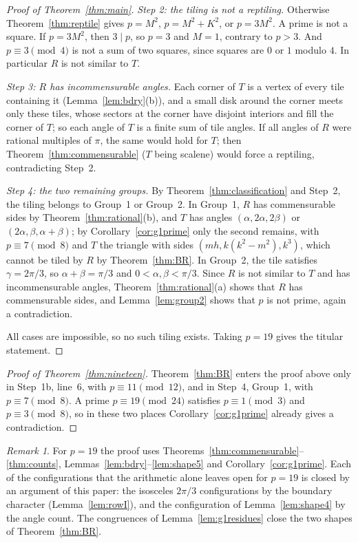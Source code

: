 \documentclass[11pt]{amsart}
\theoremstyle{remark}
\newtheorem{remark}[theorem]{Remark}
\begin{document}
\begin{proof}[Proof of Theorem~\ref{thm:main}]
\emph{Step 2: the tiling is not a reptiling.} Otherwise Theorem~\ref{thm:reptile} gives $p=M^2$, $p=M^2+K^2$, or $p=3M^2$. A prime is not a square. If $p=3M^2$, then $3\mid p$, so $p=3$ and $M=1$, contrary to $p>3$. And $p\equiv 3\pmod 4$ is not a sum of two squares, since squares are $0$ or $1$ modulo $4$. In particular $R$ is not similar to $T$.

\emph{Step 3: $R$ has incommensurable angles.} Each corner of $T$ is a vertex of every tile containing it (Lemma~\ref{lem:bdry}(b)), and a small disk around the corner meets only these tiles, whose sectors at the corner have disjoint interiors and fill the corner of $T$; so each angle of $T$ is a finite sum of tile angles. If all angles of $R$ were rational multiples of $\pi$, the same would hold for $T$; then Theorem~\ref{thm:commensurable} ($T$ being scalene) would force a reptiling, contradicting Step~2.

\emph{Step 4: the two remaining groups.} By Theorem~\ref{thm:classification} and Step~2, the tiling belongs to Group~1 or Group~2. In Group~1, $R$ has commensurable sides by Theorem~\ref{thm:rational}(b), and $T$ has angles $(\alpha,2\alpha,2\beta)$ or $(2\alpha,\beta,\alpha+\beta)$; by Corollary~\ref{cor:g1prime} only the second remains, with $p\equiv7\pmod8$ and $T$ the triangle with sides $(mh,k(k^2-m^2),k^3)$, which cannot be tiled by $R$ by Theorem~\ref{thm:BR}. In Group~2, the tile satisfies $\gamma=2\pi/3$, so $\alpha+\beta=\pi/3$ and $0<\alpha,\beta<\pi/3$. Since $R$ is not similar to $T$ and has incommensurable angles, Theorem~\ref{thm:rational}(a) shows that $R$ has commensurable sides, and Lemma~\ref{lem:group2} shows that $p$ is not prime, again a contradiction.

All cases are impossible, so no such tiling exists. Taking $p=19$ gives the titular statement.
\end{proof}

\begin{proof}[Proof of Theorem~\ref{thm:nineteen}]
Theorem~\ref{thm:BR} enters the proof above only in Step~1b, line~6, with $p\equiv11\pmod{12}$, and in Step~4, Group~1, with $p\equiv7\pmod8$. A prime $p\equiv19\pmod{24}$ satisfies $p\equiv1\pmod3$ and $p\equiv3\pmod8$, so in these two places Corollary~\ref{cor:g1prime} already gives a contradiction.
\end{proof}

\begin{remark}
For $p=19$ the proof uses Theorems~\ref{thm:commensurable}--\ref{thm:counts}, Lemmas~\ref{lem:bdry}--\ref{lem:shape5} and Corollary~\ref{cor:g1prime}. Each of the configurations that the arithmetic alone leaves open for $p=19$ is closed by an argument of this paper: the isosceles $2\pi/3$ configurations by the boundary character (Lemma~\ref{lem:rowI}), and the configuration of Lemma~\ref{lem:shape4} by the angle count. The congruences of Lemma~\ref{lem:g1residues} close the two shapes of Theorem~\ref{thm:BR}.
\end{remark}
\end{document}
